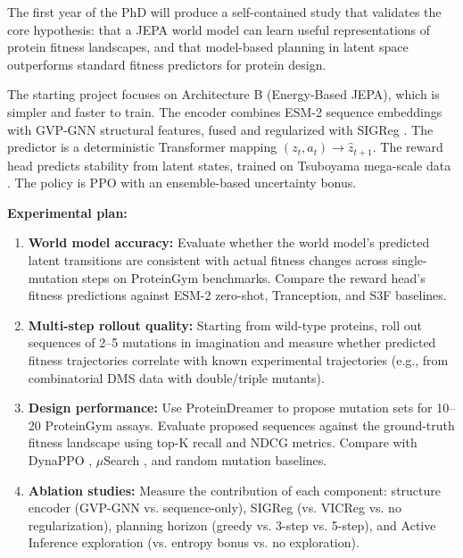 \documentclass[12pt, a4paper]{article}
\begin{document}
The first year of the PhD will produce a self-contained study that validates the core hypothesis: that a JEPA world model can learn useful representations of protein fitness landscapes, and that model-based planning in latent space outperforms standard fitness predictors for protein design.

The starting project focuses on Architecture B (Energy-Based JEPA), which is simpler and faster to train. The encoder combines ESM-2 \citep{lin2023esm2} sequence embeddings with GVP-GNN \citep{jing2021gvp} structural features, fused and regularized with SIGReg \citep{maes2026leworldmodel}. The predictor is a deterministic Transformer mapping $(z_t, a_t) \to \hat{z}_{t+1}$. The reward head predicts stability from latent states, trained on Tsuboyama mega-scale data \citep{tsuboyama2023megascale}. The policy is PPO with an ensemble-based uncertainty bonus.

\textbf{Experimental plan:}
\begin{enumerate}
    \item \textbf{World model accuracy:} Evaluate whether the world model's predicted latent transitions are consistent with actual fitness changes across single-mutation steps on ProteinGym \citep{notin2023proteingym} benchmarks. Compare the reward head's fitness predictions against ESM-2 zero-shot, Tranception, and S3F \citep{zhang2024s3f} baselines.

    \item \textbf{Multi-step rollout quality:} Starting from wild-type proteins, roll out sequences of 2--5 mutations in imagination and measure whether predicted fitness trajectories correlate with known experimental trajectories (e.g., from combinatorial DMS data with double/triple mutants).

    \item \textbf{Design performance:} Use ProteinDreamer to propose mutation sets for 10--20 ProteinGym assays. Evaluate proposed sequences against the ground-truth fitness landscape using top-K recall and NDCG metrics. Compare with DynaPPO \citep{angermueller2020dynappo}, $\mu$Search \citep{sun2025muprotein}, and random mutation baselines.

    \item \textbf{Ablation studies:} Measure the contribution of each component: structure encoder (GVP-GNN vs. sequence-only), SIGReg (vs. VICReg vs. no regularization), planning horizon (greedy vs. 3-step vs. 5-step), and Active Inference exploration (vs. entropy bonus vs. no exploration).
\end{enumerate}
\end{document}
